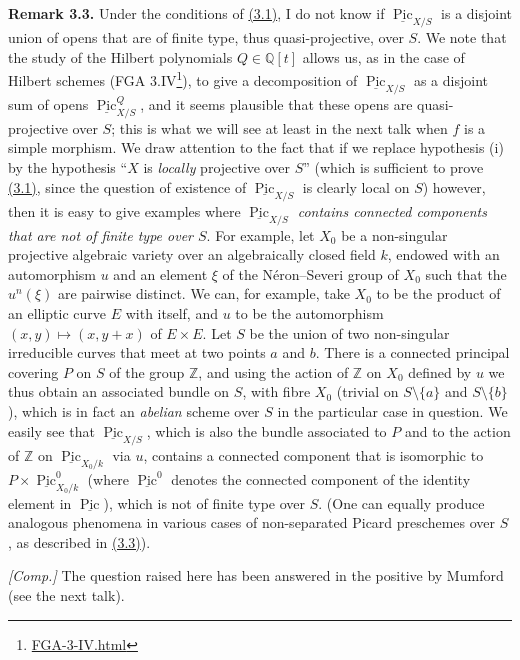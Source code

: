 \documentclass{article}
\renewcommand{\href}[2]{#2\footnote{\url{#1}}}
\newenvironment{rmenv}[1]
  {\phantomsection\par\smallskip\noindent\textbf{#1.}\rmfamily}
  {\par\smallskip}
\newcommand{\oldpage}[1]{\marginpar{\footnotesize$\Big\vert$ \textit{p.~#1}}}
\theoremstyle{definition}
\theoremstyle{definition}
\theoremstyle{definition}
\theoremstyle{definition}
\theoremstyle{remark}
\begin{document}
\leavevmode{}%
\begin{rmenv}{Remark 3.3}
Under the conditions of \protect\hyperlink{fga-3-v-theorem-3.1}{(3.1)}, I do not know if \(\underline{\operatorname{Pic}}_{X/S}\) is a disjoint union of opens that are of finite type, thus quasi-projective, over \(S\).
We note that the study of the Hilbert polynomials \(Q\in\mathbb{Q}[t]\) allows us, as in the case of Hilbert schemes (\href{FGA-3-IV.html}{FGA 3.IV}), to give a decomposition of \(\underline{\operatorname{Pic}}_{X/S}\) as a disjoint sum of opens \(\underline{\operatorname{Pic}}_{X/S}^Q\), and it seems plausible that these opens are quasi-projective over \(S\);
this is what we will see at least in the next talk when \(f\) is a simple morphism.
We draw attention to the fact that if we replace hypothesis (i) by the hypothesis ``\(X\) is \emph{locally} projective over \(S\)'' (which is sufficient to prove \protect\hyperlink{fga-3-v-theorem-3.1}{(3.1)}, since the question of existence of \(\underline{\operatorname{Pic}}_{X/S}\) is clearly local on \(S\)) however, then it is easy to give examples where \emph{\(\underline{\operatorname{Pic}}_{X/S}\) contains connected components that are not of finite type over \(S\)}.
\oldpage{232-08}For example, let \(X_0\) be a non-singular projective algebraic variety over an algebraically closed field \(k\), endowed with an automorphism \(u\) and an element \(\xi\) of the Néron--Severi group of \(X_0\) such that the \(u^n(\xi)\) are pairwise distinct.
We can, for example, take \(X_0\) to be the product of an elliptic curve \(E\) with itself, and \(u\) to be the automorphism \((x,y)\mapsto(x,y+x)\) of \(E\times E\).
Let \(S\) be the union of two non-singular irreducible curves that meet at two points \(a\) and \(b\).
There is a connected principal covering \(P\) on \(S\) of the group \(\mathbb{Z}\), and using the action of \(\mathbb{Z}\) on \(X_0\) defined by \(u\) we thus obtain an associated bundle on \(S\), with fibre \(X_0\) (trivial on \(S\setminus\{a\}\) and \(S\setminus\{b\}\)), which is in fact an \emph{abelian} scheme over \(S\) in the particular case in question.
We easily see that \(\underline{\operatorname{Pic}}_{X/S}\), which is also the bundle associated to \(P\) and to the action of \(\mathbb{Z}\) on \(\underline{\operatorname{Pic}}_{X_0/k}\) via \(u\), contains a connected component that is isomorphic to \(P\times\underline{\operatorname{Pic}}_{X_0/k}^0\) (where \(\underline{\operatorname{Pic}}^0\) denotes the connected component of the identity element in \(\underline{\operatorname{Pic}}\)), which is not of finite type over \(S\).
(One can equally produce analogous phenomena in various cases of non-separated Picard preschemes over \(S\), as described in \protect\hyperlink{fga-3-v-remark-3.3}{(3.3)}).

\emph{{[}Comp.{]}}
The question raised here has been answered in the positive by Mumford (see the next talk).

\end{rmenv}
\end{document}
